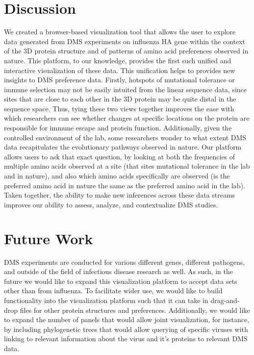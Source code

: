 \documentclass[sigchi]{acmart}
\begin{document}
\section{Discussion}

We created a browser-based visualization tool that allows the user to explore data generated from DMS experiments on influenza HA gene within the context of the 3D protein structure and of patterns of amino acid preferences observed in nature. This platform, to our knowledge, provides the first such unified and interactive visualization of these data. This unification helps to provides new insights to DMS preference data. Firstly, hotspots of mutational tolerance or immune selection may not be easily intuited from the linear sequence data, since sites that are close to each other in the 3D protein may be quite distal in the sequence space. Thus, tying these two views together improves the ease with which researchers can see whether changes at specific locations on the protein are responsible for immune escape and protein function. Additionally, given the controlled environment of the lab, some researchers wonder to what extent DMS data recapitulates the evolutionary pathways observed in nature. Our platform allows users to ask that exact question, by looking at both the frequencies of multiple amino acids observed at a site (that sites mutational tolerance in the lab and in nature), and also which amino acids specifically are observed (is the preferred amino acid in nature the same as the preferred amino acid in the lab). Taken together, the ability to make new inferences across these data streams improves our ability to assess, analyze, and contextualize DMS studies.

\section{Future Work}

DMS experiments are conducted for various different genes, different pathogens, and outside of the field of infectious disease research as well. As such, in the future we would like to expand this visualization platform to accept data sets other than from influenza. To facilitate wider use, we would like to build functionality into the visualization platform such that it can take in drag-and-drop files for other protein structures and preferences. Additionally, we would like to expand the number of panels that would allow joint visualization, for instance, by including phylogenetic trees that would allow querying of specific viruses with linking to relevant information about the virus and it’s proteins to relevant DMS data.



\end{document}
